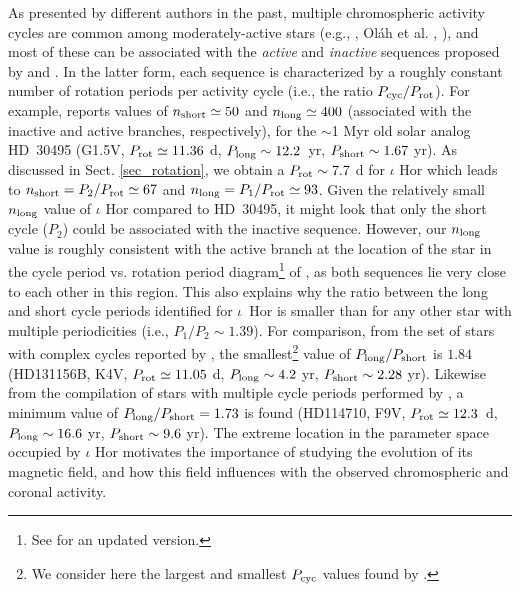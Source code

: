 \documentclass[a4paper,fleqn,usenatbib]{mnras}
\begin{document}
As presented by different authors in the past, multiple chromospheric activity cycles are common among moderately-active stars (e.g., , Ol\'ah et al. , ), and most of these can be associated with the \textit{active} and \textit{inactive} sequences proposed by  and . In the latter form, each sequence is characterized by a roughly constant number of rotation periods per activity cycle (i.e., the ratio $P_{\rm cyc}/P_{\rm rot}$). For example,  reports values of $n_{\rm short} \simeq 50$ and $n_{\rm long} \simeq 400$ (associated with the inactive and active branches, respectively), for the $\sim$1 Myr old solar analog HD~30495 (G1.5V, $P_{\rm rot} \simeq 11.36$ d, $P_{\rm long} \sim 12.2$~yr, $P_{\rm short} \sim 1.67$ yr). As discussed in Sect. \ref{sec_rotation}, we obtain a $P_{\rm rot} \sim 7.7$ d for $\iota$ Hor which leads to $n_{\rm short} = P_{2}/P_{\rm rot} \simeq 67$ and $n_{\rm long} = P_{1}/P_{\rm rot} \simeq 93$. Given the relatively small $n_{\rm long}$ value of $\iota$ Hor compared to HD~30495, it might look that only the short cycle ($P_{2}$) could be associated with the inactive sequence. However, our $n_{\rm long}$ value is roughly consistent with the active branch at the location of the star in the cycle period vs. rotation period diagram\footnote[11]{See  for an updated version.} of , as both sequences lie very close to each other in this region. This also explains why the ratio between the long and short cycle periods identified for $\iota$~Hor is smaller than for any other star with multiple periodicities (i.e., $P_{1}/P_{2} \sim 1.39$). For comparison, from the set of stars with complex cycles reported by , the smallest\footnote[12]{We consider here the largest and smallest $P_{\rm cyc}$ values found by .} value of $P_{\rm long}/P_{\rm short}$ is $1.84$ (HD131156B, K4V, $P_{\rm rot} \simeq 11.05$ d, $P_{\rm long} \sim 4.2$ yr, $P_{\rm short} \sim 2.28$ yr). Likewise from the compilation of stars with multiple cycle periods performed by , a minimum value of $P_{\rm long}/P_{\rm short} = 1.73$ is found (HD114710, F9V, $P_{\rm rot} \simeq 12.3$~d, $P_{\rm long} \sim 16.6$ yr, $P_{\rm short} \sim 9.6$ yr). The extreme location in the parameter space occupied by $\iota$ Hor motivates the importance of studying the evolution of its magnetic field, and how this field influences with the observed chromospheric and coronal activity. 
\end{document}
